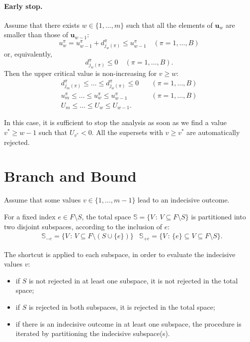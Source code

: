 \documentclass[11pt,a4paper,openright,twoside]{article}
\begin{document}
\paragraph{Early stop.} Assume that there exists $w\in\{1,\ldots,m\}$ such that all the elements of $\textbf{u}_w$ are smaller than those of $\textbf{u}_{w-1}$:
\[u_w^\pi =u_{w-1}^\pi +d_{j_w(\pi)}^\pi\leq u_{w-1}^\pi\quad (\pi=1,\ldots,B)\]
or, equivalently,
\[d_{j_w(\pi)}^\pi\leq 0\quad (\pi=1,\ldots,B).\]
Then the upper critical value is non-increasing for $v\geq w$:
\begin{align*}
d_{j_m(\pi)}^\pi\leq \ldots \leq d_{j_w(\pi)}^\pi \leq 0&\quad(\pi=1,\ldots,B)\\
u_m^\pi \leq\ldots\leq u_w^\pi\leq u_{w-1}^\pi&\quad(\pi=1,\ldots,B)\\
U_m \leq\ldots\leq U_w\leq U_{w-1}. &
\end{align*}

In this case, it is sufficient to stop the analysis as soon as we find a value $v^*\geq w-1$ such that $U_{v^*}<0$. All the supersets with $v\geq v^*$ are automatically rejected.





\vspace{10mm}

\section{Branch and Bound}
Assume that some values $v\in\{1,\ldots,m-1\}$ lead to an indecisive outcome. 

For a fixed index $e\in F\setminus S$, the total space $\mathbb{S}=\{V\,:\,V\subseteq F\setminus S\}$ is partitioned into two disjoint subspaces, according to the inclusion of $e$:
\begin{align*}
&\mathbb{S}_{-e}=\{V\,:\,V\subseteq F\setminus(S\cup\{e\})\} & \mathbb{S}_{+e}=\{V\,:\,\{e\}\subseteq V\subseteq F\setminus S\}.
\end{align*}

The shortcut is applied to each subspace, in order to evaluate the indecisive values $v$:
\begin{itemize}
\item if $S$ is not rejected in at least one subspace, it is not rejected in the total space;
\item if $S$ is rejected in both subspaces, it is rejected in the total space;
\item if there is an indecisive outcome in at least one subspace, the procedure is iterated by partitioning the indecisive subspace(s).
\end{itemize}
\end{document}
